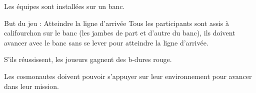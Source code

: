 \documentclass{grand-jeu}
\begin{document}
\begin{liste-materiel}
\end{liste-materiel}

\begin{installation}
Les équipes sont installées sur un banc.
\end{installation}

\begin{regles}

But du jeu : Atteindre la ligne d’arrivée
Tous les participants sont assis à califourchon sur le banc (les jambes de part et d’autre du banc), ils doivent avancer avec le banc sans se lever pour atteindre la ligne d’arrivée.


S'ils réussissent, les joueurs gagnent des b-dures rouge. 

\end{regles}

\begin{imaginaire}
Les cosmonautes doivent pouvoir s'appuyer sur leur environnement pour avancer dans leur mission. 
\end{imaginaire}

\begin{moments-stop}
\end{moments-stop}
\end{document}

